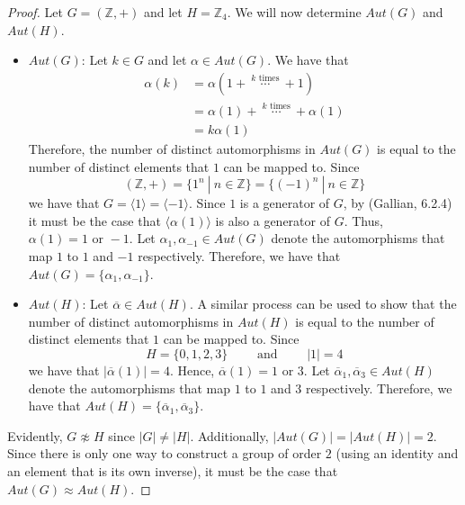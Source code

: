 \documentclass[12pt,reqno]{article}
\newcommand{\Z}{\mathbb{Z}}
\theoremstyle{plain}
\theoremstyle{definition}
\begin{document}
\begin{proof}
    Let \(G=(\Z, +)\) and let \(H=\Z_4\). We will now determine \(Aut(G)\) and \(Aut(H)\).
    \begin{itemize}
        \item \underline{\(Aut(G)\)}: Let \(k\in G\) and let \(\alpha\in Aut(G)\). We have that
        \begin{align*}
            \alpha(k)&=\alpha(1+\ \overset{k\text{ times}}{\cdots}\ +1)\\
            &=\alpha(1)+\ \overset{k\text{ times}}{\cdots}\ +\alpha(1)\\
            &=k\alpha(1)
        \end{align*}
        Therefore, the number of distinct automorphisms
        in \(Aut(G)\) is equal to the number of distinct elements that \(1\) can be mapped to.
        Since \[(\Z,+)=\{1^n\ |\ n\in\Z\}=\{(-1)^n\ |\ n\in\Z\}\]
        we have that \(G=\langle 1\rangle=\langle -1\rangle\). Since \(1\) is a generator of \(G\), by (Gallian, 6.2.4) it must be the case
        that \(\langle\alpha(1)\rangle\) is also a generator of \(G\). Thus, \(\alpha(1)=1\text{ or }-1\). Let \(\alpha_1,\alpha_{-1}\in Aut(G)\)
        denote the automorphisms that map \(1\) to \(1\) and \(-1\) respectively. Therefore, we have that
        \(Aut(G)=\{\alpha_1,\alpha_{-1}\}\).

        \item \underline{\(Aut(H)\)}: Let \(\overline{\alpha}\in Aut(H)\). A similar process can be used to show that the number of distinct automorphisms
        in \(Aut(H)\) is equal to the number of distinct elements that \(1\) can be mapped to. Since
        \[H=\{0,1,2,3\}\qquad\text{ and }\qquad |1|=4\]
        we have that \(|\overline{\alpha}(1)|=4\). Hence, \(\overline{\alpha}(1)=1\text{ or }3\). Let \(\overline{\alpha}_1,\overline{\alpha}_3\in Aut(H)\)
        denote the automorphisms that map \(1\) to \(1\) and \(3\) respectively.
        Therefore, we have that \(Aut(H)=\{\overline{\alpha}_1,\overline{\alpha}_3\}\).
    \end{itemize}

    Evidently, \(G\not\approx H\) since \(|G|\neq|H|\). Additionally, \(|Aut(G)|=|Aut(H)|=2\). Since there is only one way
    to construct a group of order \(2\) (using an identity and an element that is its own inverse), it must be the case that
    \(Aut(G)\approx Aut(H)\).
\end{proof}
\end{document}
